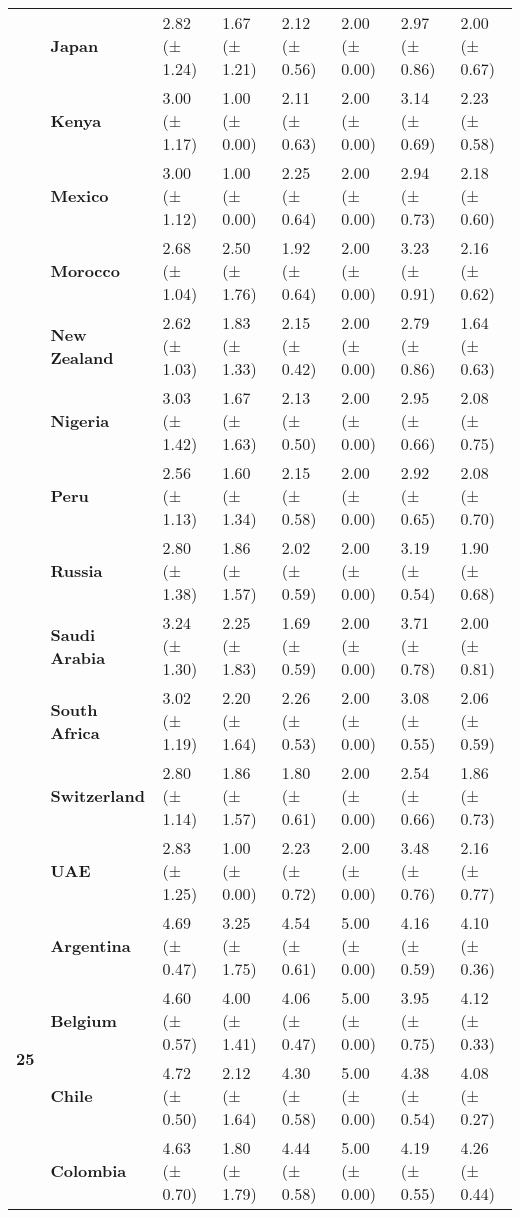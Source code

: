 \begin{longtable}{llllllll}
\textbf{} & \textbf{Japan} & 2.82 (± 1.24) & 1.67 (± 1.21) & 2.12 (± 0.56) & 2.00 (± 0.00) & 2.97 (± 0.86) & 2.00 (± 0.67) \\
\textbf{} & \textbf{Kenya} & 3.00 (± 1.17) & 1.00 (± 0.00) & 2.11 (± 0.63) & 2.00 (± 0.00) & 3.14 (± 0.69) & 2.23 (± 0.58) \\
\textbf{} & \textbf{Mexico} & 3.00 (± 1.12) & 1.00 (± 0.00) & 2.25 (± 0.64) & 2.00 (± 0.00) & 2.94 (± 0.73) & 2.18 (± 0.60) \\
\textbf{} & \textbf{Morocco} & 2.68 (± 1.04) & 2.50 (± 1.76) & 1.92 (± 0.64) & 2.00 (± 0.00) & 3.23 (± 0.91) & 2.16 (± 0.62) \\
\textbf{} & \textbf{New Zealand} & 2.62 (± 1.03) & 1.83 (± 1.33) & 2.15 (± 0.42) & 2.00 (± 0.00) & 2.79 (± 0.86) & 1.64 (± 0.63) \\
\textbf{} & \textbf{Nigeria} & 3.03 (± 1.42) & 1.67 (± 1.63) & 2.13 (± 0.50) & 2.00 (± 0.00) & 2.95 (± 0.66) & 2.08 (± 0.75) \\
\textbf{} & \textbf{Peru} & 2.56 (± 1.13) & 1.60 (± 1.34) & 2.15 (± 0.58) & 2.00 (± 0.00) & 2.92 (± 0.65) & 2.08 (± 0.70) \\
\textbf{} & \textbf{Russia} & 2.80 (± 1.38) & 1.86 (± 1.57) & 2.02 (± 0.59) & 2.00 (± 0.00) & 3.19 (± 0.54) & 1.90 (± 0.68) \\
\textbf{} & \textbf{Saudi Arabia} & 3.24 (± 1.30) & 2.25 (± 1.83) & 1.69 (± 0.59) & 2.00 (± 0.00) & 3.71 (± 0.78) & 2.00 (± 0.81) \\
\textbf{} & \textbf{South Africa} & 3.02 (± 1.19) & 2.20 (± 1.64) & 2.26 (± 0.53) & 2.00 (± 0.00) & 3.08 (± 0.55) & 2.06 (± 0.59) \\
\textbf{} & \textbf{Switzerland} & 2.80 (± 1.14) & 1.86 (± 1.57) & 1.80 (± 0.61) & 2.00 (± 0.00) & 2.54 (± 0.66) & 1.86 (± 0.73) \\
\textbf{} & \textbf{UAE} & 2.83 (± 1.25) & 1.00 (± 0.00) & 2.23 (± 0.72) & 2.00 (± 0.00) & 3.48 (± 0.76) & 2.16 (± 0.77) \\
\cline{1-8}
\multirow[t]{19}{*}{\textbf{25}} & \textbf{Argentina} & 4.69 (± 0.47) & 3.25 (± 1.75) & 4.54 (± 0.61) & 5.00 (± 0.00) & 4.16 (± 0.59) & 4.10 (± 0.36) \\
\textbf{} & \textbf{Belgium} & 4.60 (± 0.57) & 4.00 (± 1.41) & 4.06 (± 0.47) & 5.00 (± 0.00) & 3.95 (± 0.75) & 4.12 (± 0.33) \\
\textbf{} & \textbf{Chile} & 4.72 (± 0.50) & 2.12 (± 1.64) & 4.30 (± 0.58) & 5.00 (± 0.00) & 4.38 (± 0.54) & 4.08 (± 0.27) \\
\textbf{} & \textbf{Colombia} & 4.63 (± 0.70) & 1.80 (± 1.79) & 4.44 (± 0.58) & 5.00 (± 0.00) & 4.19 (± 0.55) & 4.26 (± 0.44) \\

\end{longtable}
